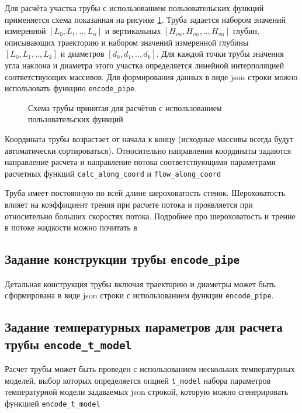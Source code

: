 Для расчёта участка трубы с использованием пользовательских функций \unf{} применяется схема показанная на рисунке \ref{ris:Pipe_scheme_1}. Труба задается набором значений измеренной $[L_0, L_1,..,L_n]$ и вертикальных $[H_{vn}, H_{vn},..,H_{vn}]$ глубин, описывающих траекторию и набором значений измеренной глубины $[L_0, L_1,..,L_k]$ и диаметров $[d_0, d_1,..,d_k]$. Для каждой точки трубы значения угла наклона и диаметра этого участка определяется линейной интерполяцией соответствующих массивов. Для формирования данных в виде json строки можно использовать функцию  \texttt{encode_pipe}.

\begin{figure}[H]
	\begin{center}
		
		\caption{Схема трубы принятая для расчётов с использованием пользовательских функций}
		\label{ris:Pipe_scheme_1}
	\end{center}
\end{figure}

Координата трубы возрастает от начала к концу (исходные массивы всегда будут автоматически сортироваться). Относительно направления координаты задаются направление расчета и направление потока соответствующими параметрами расчетных функций \texttt{calc_along_coord} и \texttt{flow_along_coord}

Труба имеет постоянную по всей длине шероховатость стенок. Шероховатость влияет на коэффициент трения при расчете потока и проявляется при относительно больших скоростях потока. Подробнее про шероховатость и трение в потоке жидкости можно почитать в \cite{Bratland_Pipe_Flow_1}

\subsection{Задание конструкции трубы \texttt{encode_pipe}}

Детальная конструкция трубы включая траекторию и диаметры может быть сформирована в виде json строки с использованием функции \texttt{encode_pipe}.



\subsection{Задание температурных параметров для расчета трубы \texttt{encode_t_model}}

Расчет трубы может быть проведен с использованием нескольких температурных моделей, выбор которых определяется опцией \texttt{t_model}  набора параметров температурной модели задаваемых json строкой, которую можно сгенерировать функцией \texttt{encode_t_model}

